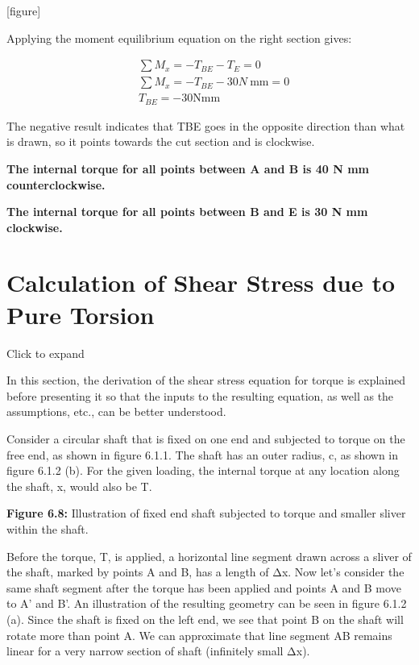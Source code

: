 \documentclass[
  letterpaper,
  DIV=11,
  numbers=noendperiod]{scrreprt}
\begin{document}
\begin{tcolorbox}
\begin{tcolorbox}
{[}figure{]}

Applying the moment equilibrium equation on the right section gives:

\[
\begin{aligned}
& \sum M_x=-T_{B E}-T_E=0 \\
& \sum M_x=-T_{B E}-30 N \mathrm{~mm}=0 \\
& T_{B E}=-30 \mathrm{Nmm}
\end{aligned}
\]

The negative result indicates that TBE goes in the opposite direction
than what is drawn, so it points towards the cut section and is
clockwise.

\textbf{The internal torque for all points between A and B is 40 N mm
counterclockwise.}

\textbf{The internal torque for all points between B and E is 30 N mm
clockwise.}

\end{tcolorbox}

\end{tcolorbox}

\section{Calculation of Shear Stress due to Pure Torsion}\label{sec-6.1}

Click to expand

In this section, the derivation of the shear stress equation for torque
is explained before presenting it so that the inputs to the resulting
equation, as well as the assumptions, etc., can be better understood.

Consider a circular shaft that is fixed on one end and subjected to
torque on the free end, as shown in figure 6.1.1. The shaft has an outer
radius, c, as shown in figure 6.1.2 (b). For the given loading, the
internal torque at any location along the shaft, x, would also be T.

\textbf{Figure 6.8:} Illustration of fixed end shaft subjected to torque
and smaller sliver within the shaft.

Before the torque, T, is applied, a horizontal line segment drawn across
a sliver of the shaft, marked by points A and B, has a length of Δx. Now
let's consider the same shaft segment after the torque has been applied
and points A and B move to A' and B'. An illustration of the resulting
geometry can be seen in figure 6.1.2 (a). Since the shaft is fixed on
the left end, we see that point B on the shaft will rotate more than
point A. We can approximate that line segment AB remains linear for a
very narrow section of shaft (infinitely small Δx).
\end{document}
